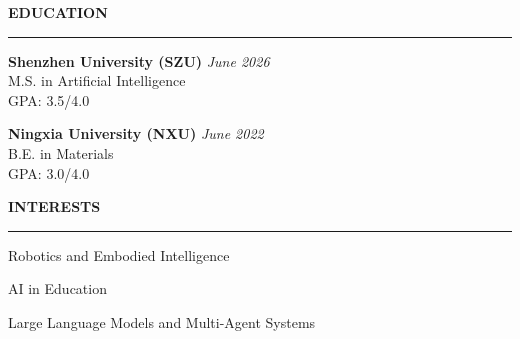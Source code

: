 \documentclass{resume} %
\renewenvironment{rSection}[1]{
  \sectionskip
  \textbf{\MakeUppercase{#1}}
  \sectionlineskip
  \hrule
  \begin{list}{}{
  \setlength{\leftmargin}{1.5em}
  }
  \item[]
  }{
  \end{list}
  }
\begin{document}
  \begin{rSection}{Education}
  {\bf Shenzhen University (SZU)} \hfill {\em June 2026} \\
  M.S. in Artificial Intelligence \\
  GPA: 3.5/4.0

  {\bf Ningxia University (NXU)} \hfill {\em June 2022} \\
  B.E. in Materials \\
  GPA: 3.0/4.0
  \end{rSection}

  \begin{rSection}{Interests}
  \begin{rSubsection}{}{}{}{}
  \item Robotics and Embodied Intelligence
  \item AI in Education
  \item Large Language Models and Multi-Agent Systems
  \end{rSubsection}
  \end{rSection}
\end{document}
